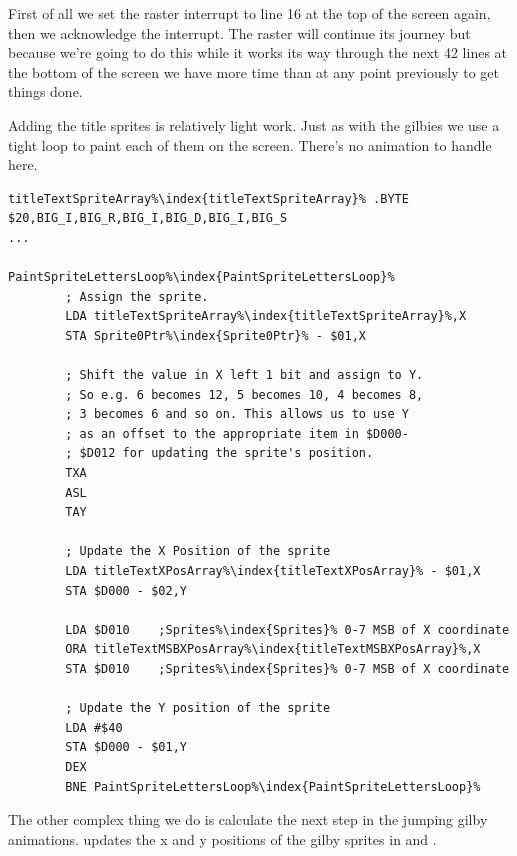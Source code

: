 First of all we set the raster interrupt to line 16 at the top of the screen again, then we acknowledge the interrupt. The
raster will continue its journey but because we're going to do this while it works its way through the next 42 lines at the bottom 
of the screen we have more time than at any point previously to get things done.

Adding the title sprites is relatively light work. Just as with the gilbies we use a tight loop to paint each of them
on the screen. There's no animation to handle here.

\begin{lstlisting}[escapechar=\%]
titleTextSpriteArray%\index{titleTextSpriteArray}% .BYTE $20,BIG_I,BIG_R,BIG_I,BIG_D,BIG_I,BIG_S
...

PaintSpriteLettersLoop%\index{PaintSpriteLettersLoop}%   
        ; Assign the sprite.
        LDA titleTextSpriteArray%\index{titleTextSpriteArray}%,X
        STA Sprite0Ptr%\index{Sprite0Ptr}% - $01,X

        ; Shift the value in X left 1 bit and assign to Y.
        ; So e.g. 6 becomes 12, 5 becomes 10, 4 becomes 8,
        ; 3 becomes 6 and so on. This allows us to use Y
        ; as an offset to the appropriate item in $D000-
        ; $D012 for updating the sprite's position.
        TXA
        ASL
        TAY

        ; Update the X Position of the sprite
        LDA titleTextXPosArray%\index{titleTextXPosArray}% - $01,X
        STA $D000 - $02,Y

        LDA $D010    ;Sprites%\index{Sprites}% 0-7 MSB of X coordinate
        ORA titleTextMSBXPosArray%\index{titleTextMSBXPosArray}%,X
        STA $D010    ;Sprites%\index{Sprites}% 0-7 MSB of X coordinate

        ; Update the Y position of the sprite
        LDA #$40
        STA $D000 - $01,Y
        DEX
        BNE PaintSpriteLettersLoop%\index{PaintSpriteLettersLoop}%

\end{lstlisting}

The other complex thing we do is calculate the next step in the jumping gilby animations. 
updates the x and y positions of the gilby sprites in  and .

